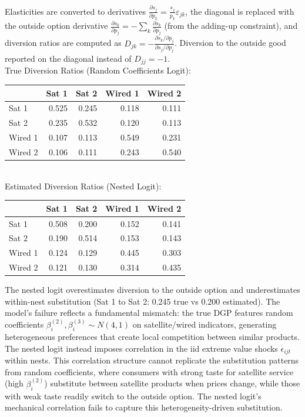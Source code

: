 \documentclass[english,11pt]{article}
\begin{document}
\noindent Elasticities are converted to derivatives $\frac{\partial s_j}{\partial p_k} = \frac{s_j}{p_k}\varepsilon_{jk}$, the diagonal is replaced with the outside option derivative $\frac{\partial s_0}{\partial p_j} = -\sum_k \frac{\partial s_k}{\partial p_j}$ (from the adding-up constraint), and diversion ratios are computed as $D_{jk} = -\frac{\partial s_k/\partial p_j}{\partial s_j/\partial p_j}$. Diversion to the outside good reported on the diagonal instead of $D_{jj}=-1.$ 
\\
\newline
True Diversion Ratios (Random Coefficients Logit):
\begin{center}
\begin{tabular}{lrrrr}
\hline
 & Sat 1 & Sat 2 & Wired 1 & Wired 2 \\
\hline
Sat 1 & 0.525 & 0.245 & 0.118 & 0.111 \\
Sat 2 & 0.235 & 0.532 & 0.120 & 0.113 \\
Wired 1 & 0.107 & 0.113 & 0.549 & 0.231 \\
Wired 2 & 0.106 & 0.111 & 0.243 & 0.540 \\
\hline
\end{tabular}
\end{center}
\\
\newline
Estimated Diversion Ratios (Nested Logit):
\begin{center}
\begin{tabular}{lrrrr}
\hline
 & Sat 1 & Sat 2 & Wired 1 & Wired 2 \\
\hline
Sat 1 & 0.508 & 0.200 & 0.152 & 0.141 \\
Sat 2 & 0.190 & 0.514 & 0.153 & 0.143 \\
Wired 1 & 0.124 & 0.129 & 0.445 & 0.303 \\
Wired 2 & 0.121 & 0.130 & 0.314 & 0.435 \\
\hline
\end{tabular}
\end{center}

\noindent The nested logit overestimates diversion to the outside option and underestimates within-nest substitution (Sat 1 to Sat 2: 0.245 true vs 0.200 estimated). The model's failure reflects a fundamental mismatch: the true DGP features random coefficients $\beta_i^{(2)}, \beta_i^{(3)} \sim N(4,1)$ on satellite/wired indicators, generating heterogeneous preferences that create local competition between similar products. The nested logit instead imposes correlation in the iid extreme value shocks $\epsilon_{ijt}$ within nests. This correlation structure cannot replicate the substitution patterns from random coefficients, where consumers with strong taste for satellite service (high $\beta_i^{(2)}$) substitute between satellite products when prices change, while those with weak taste readily switch to the outside option. The nested logit's mechanical correlation fails to capture this heterogeneity-driven substitution.
\end{document}
